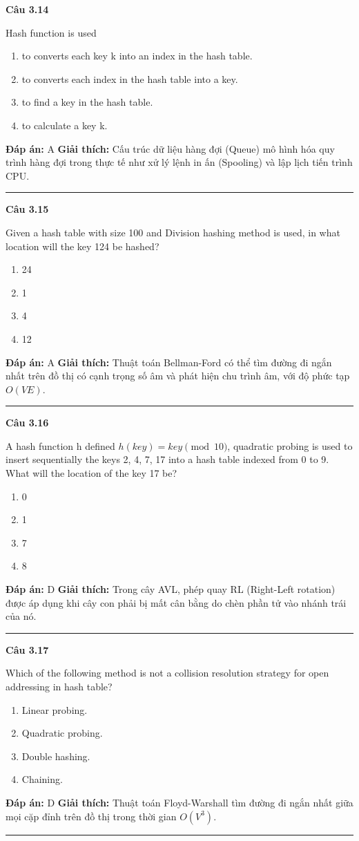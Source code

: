 \documentclass[11pt,a4paper]{article}
\newenvironment{question}[1]{%
  \par\vspace{1em}\noindent\textbf{\large Câu #1}\par\vspace{0.4em}
}{%
  \par\vspace{1em}\hrule\vspace{0.6em}
}
\newenvironment{choices}{%
  \begin{enumerate}[label=\textbf{\Alph*.},leftmargin=2.2em,itemsep=2pt,topsep=3pt]
}{%
  \end{enumerate}
}
\newcommand{\choice}{\item}
\begin{document}
\begin{question}{3.14}
Hash function is used
\begin{choices}
\choice to converts each key k into an index in the hash table.
\choice to converts each index in the hash table into a key.
\choice to find a key in the hash table.
\choice to calculate a key k.
\end{choices}
\textbf{Đáp án:} A
\textbf{Giải thích:} Cấu trúc dữ liệu hàng đợi (Queue) mô hình hóa quy trình hàng đợi trong thực tế như xử lý lệnh in ấn (Spooling) và lập lịch tiến trình CPU.
\end{question}

\begin{question}{3.15}
Given a hash table with size 100 and Division hashing method is used, in what location will the key 124 be hashed?
\begin{choices}
\choice 24
\choice 1
\choice 4
\choice 12
\end{choices}
\textbf{Đáp án:} A
\textbf{Giải thích:} Thuật toán Bellman-Ford có thể tìm đường đi ngắn nhất trên đồ thị có cạnh trọng số âm và phát hiện chu trình âm, với độ phức tạp $O(VE)$.
\end{question}

\begin{question}{3.16}
A hash function h defined $h(key) = key \pmod{10}$, quadratic probing is used to insert sequentially the keys 2, 4, 7, 17 into a hash table indexed from 0 to 9. What will the location of the key 17 be?
\begin{choices}
\choice 0
\choice 1
\choice 7
\choice 8
\end{choices}
\textbf{Đáp án:} D
\textbf{Giải thích:} Trong cây AVL, phép quay RL (Right-Left rotation) được áp dụng khi cây con phải bị mất cân bằng do chèn phần tử vào nhánh trái của nó.
\end{question}

\begin{question}{3.17}
Which of the following method is not a collision resolution strategy for open addressing in hash table?
\begin{choices}
\choice Linear probing.
\choice Quadratic probing.
\choice Double hashing.
\choice Chaining.
\end{choices}
\textbf{Đáp án:} D
\textbf{Giải thích:} Thuật toán Floyd-Warshall tìm đường đi ngắn nhất giữa mọi cặp đỉnh trên đồ thị trong thời gian $O(V^3)$.
\end{question}
\end{document}
